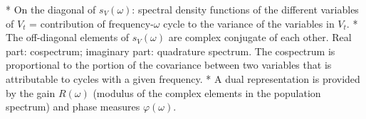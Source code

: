 * On the diagonal of $s_{V}(\omega)$: spectral density functions of the different variables of $V_{t}$ = contribution of frequency-$\omega$ cycle
to the variance of the variables in $V_{t}$.
* The off-diagonal elements
of $s_{V}(\omega)$ are complex conjugate of each other. Real  part: {\color{blue}cospectrum}; imaginary
part: {\color{blue}quadrature spectrum}. The cospectrum is proportional to the portion of the covariance
between two variables that is attributable to cycles with a given frequency. 
* A dual representation is provided by
the gain $R(\omega)$ (modulus of the complex elements in the population
spectrum) and phase measures $\varphi(\omega)$.





